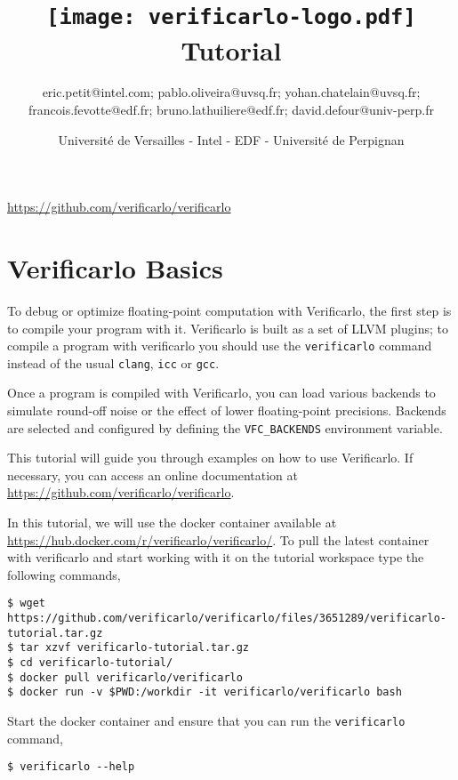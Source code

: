 \documentclass{TP}
\title{\texttt{[image: verificarlo-logo.pdf]}\\[4mm]
  Tutorial}
\author{eric.petit@intel.com; pablo.oliveira@uvsq.fr; yohan.chatelain@uvsq.fr;
  francois.fevotte@edf.fr; bruno.lathuiliere@edf.fr; david.defour@univ-perp.fr}
\date{Université de Versailles - Intel - EDF - Université de Perpignan}
\begin{document}
\maketitle

\centerline{\url{https://github.com/verificarlo/verificarlo}}
\tableofcontents


\section{Verificarlo Basics}

To debug or optimize floating-point computation with Verificarlo, the first
step is to compile your program with it. Verificarlo is built as a set of LLVM
plugins; to compile a program with verificarlo you should use the \texttt{verificarlo}
command instead of the usual \texttt{clang}, \texttt{icc} or \texttt{gcc}.

Once a program is compiled with Verificarlo, you can load various backends to
simulate round-off noise or the effect of lower floating-point precisions. Backends are selected and configured by defining the \texttt{VFC\_BACKENDS} environment variable.

This tutorial will guide you through examples on how to use Verificarlo. 
If necessary, you can access an online documentation at \url{https://github.com/verificarlo/verificarlo}.

In this tutorial, we will use the docker container available at
\url{https://hub.docker.com/r/verificarlo/verificarlo/}.
To pull the latest container with verificarlo and start working with it on
the tutorial workspace type the following commands,
\begin{verbatim}
$ wget https://github.com/verificarlo/verificarlo/files/3651289/verificarlo-tutorial.tar.gz
$ tar xzvf verificarlo-tutorial.tar.gz
$ cd verificarlo-tutorial/
$ docker pull verificarlo/verificarlo
$ docker run -v $PWD:/workdir -it verificarlo/verificarlo bash
\end{verbatim}

\begin{question}
  Start the docker container and ensure that you can run the \texttt{verificarlo} command,
\begin{verbatim}
$ verificarlo --help
\end{verbatim}
\end{question}


\FloatBarrier


\FloatBarrier





\FloatBarrier
\newpage


\end{document}
